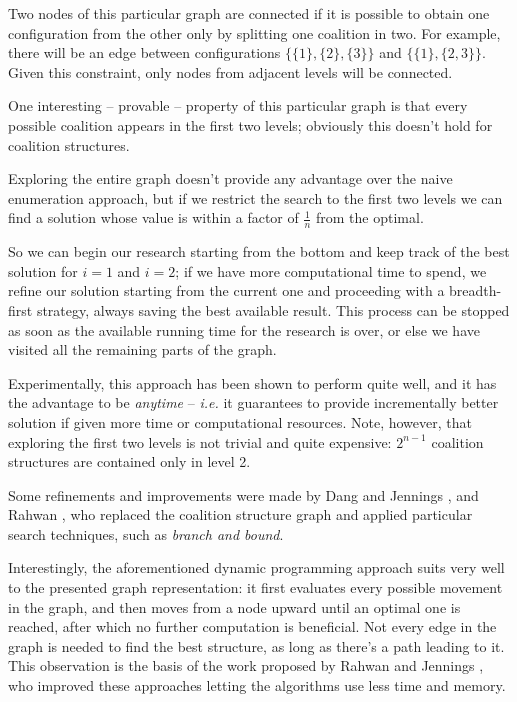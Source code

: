 \documentclass[11pt, twoside, titlepage, a4paper, openright]{report}
\begin{document}
Two nodes of this particular graph are connected if it is possible to obtain one configuration from the other only by splitting one coalition in two. For example, there will be an edge between configurations $\{\{1\},\{2\},\{3\}\}$ and $\{\{1\},\{2,3\}\}$. Given this constraint, only nodes from adjacent levels will be connected.

One interesting -- provable -- property of this particular graph is that every possible coalition appears in the first two levels; obviously this doesn't hold for coalition structures.

Exploring the entire graph doesn't provide any advantage over the naive enumeration approach, but if we restrict the search to the first two levels we can find a solution whose value is within a factor of $\frac{1}{n}$ from the optimal. 

So we can begin our research starting from the bottom and keep track of the best solution for $i=1$ and $i=2$; if we have more computational time to spend, we refine our solution starting from the current one and proceeding with a breadth-first strategy, always saving the best available result. This process can be stopped as soon as the available running time for the research is over, or else we have visited all the remaining parts of the graph.

Experimentally, this approach has been shown to perform quite well, and it has the advantage to be \textit{anytime} -- \textit{i.e.} it guarantees to provide incrementally better solution if given more time or computational resources. Note, however, that exploring the first two levels is not trivial and quite expensive: $2^{n-1}$ coalition structures are contained only in level 2.

Some refinements and improvements were made by Dang and Jennings \cite{Dang04generatingcoalition}, and Rahwan \cite{DBLP:journals/jair/RahwanRJG09}, who replaced the coalition structure graph and applied particular search techniques, such as \textit{branch and bound}.

Interestingly, the aforementioned dynamic programming approach suits very well to the presented graph representation: it first evaluates every possible movement in the graph, and then moves from a node upward until an optimal one is reached, after which no further computation is beneficial. Not every edge in the graph is needed to find the best structure, as long as there's a path leading to it. This observation is the basis of the work proposed by Rahwan and Jennings \cite{Rahwan08animproved}, who improved these approaches letting the algorithms use less time and memory. 
\end{document}
